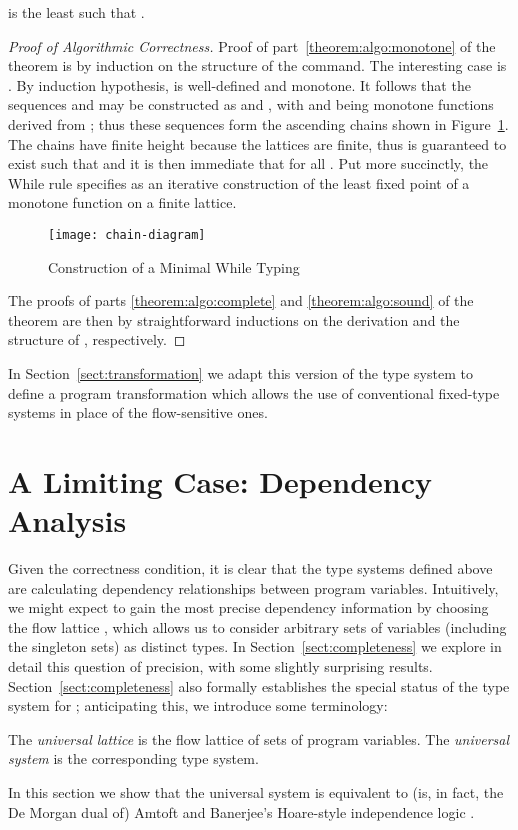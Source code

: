 \documentclass{sigplanconf}
\begin{document}
\begin{table}
\begin{theorem}
\begin{enumerate}
\end{enumerate}
\end{theorem}
\begin{corollary}\label{coroll:algo}
     is the least  such that .
\end{corollary}
\begin{proof}[Proof of Algorithmic Correctness]
Proof of part~\ref{theorem:algo:monotone} of the theorem is by induction on the structure of the command.
The interesting case is .
By induction hypothesis,  is well-defined and monotone.
It follows that the sequences 
and  may be constructed
as  and ,
with  and  being monotone functions derived from ; thus these sequences
form the ascending chains shown in Figure~\ref{fig:chain}. The chains have finite height because the
lattices are finite, thus  is guaranteed to exist such that 
and it is then immediate that  for all . Put more succinctly, the While rule specifies
 as an iterative construction of the least fixed point of a monotone function on a finite lattice.
\begin{figure}
\begin{center}
    \texttt{[image: chain-diagram]}
\end{center}
\caption{Construction of a Minimal While Typing}
\label{fig:chain}
\end{figure}

The proofs of parts \ref{theorem:algo:complete} and \ref{theorem:algo:sound} of the theorem are then by straightforward inductions
on the  derivation and the structure of , respectively.
\end{proof}
In Section~\ref{sect:transformation} we adapt this version of the type system to define a program transformation
which allows the use of conventional fixed-type systems in place of the flow-sensitive ones.



\section{A Limiting Case: Dependency Analysis}
Given the correctness condition, it is clear that the type systems defined above
are calculating dependency relationships between program variables.
Intuitively, we might expect to gain the most precise dependency information by choosing the flow
lattice , which allows us to consider arbitrary sets of variables (including the singleton sets)
as distinct types.
In Section~\ref{sect:completeness}
we explore in detail this question of precision, with some slightly
surprising results.
Section~\ref{sect:completeness} also
formally establishes the special status of the type system for ;
anticipating this, we introduce some terminology:
\begin{definition}
The \emph{universal lattice} is the flow lattice  of sets of program variables.
The \emph{universal system} is the corresponding type system.
\end{definition}
In this section we show that the universal system is equivalent to (is, in fact, the De Morgan dual of)
Amtoft and Banerjee's Hoare-style independence logic \cite{Amtoft:Banerjee:SAS04}.


\end{table}
\end{document}
